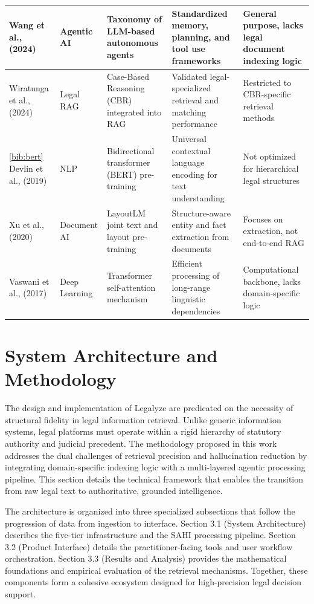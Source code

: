 \documentclass[a4paper,fleqn]{cas-dc}
\begin{document}
\begin{table}[t!]
\begin{tabular}{|m{2.3cm}|m{1.5cm}|m{3cm}|m{4cm}|m{4cm}|}
Wang et al., (2024) & Agentic AI & Taxonomy of LLM-based autonomous agents & Standardized memory, planning, and tool use frameworks & General purpose, lacks legal document indexing logic \\ \hline
Wiratunga et al., (2024) & Legal RAG & Case-Based Reasoning (CBR) integrated into RAG & Validated legal-specialized retrieval and matching performance & Restricted to CBR-specific retrieval methods \\ \hline
\ref{bib:bert} Devlin et al., (2019) & NLP & Bidirectional transformer (BERT) pre-training & Universal contextual language encoding for text understanding & Not optimized for hierarchical legal structures \\ \hline
Xu et al., (2020) & Document AI & LayoutLM joint text and layout pre-training & Structure-aware entity and fact extraction from documents & Focuses on extraction, not end-to-end RAG \\ \hline
Vaswani et al., (2017) & Deep Learning & Transformer self-attention mechanism & Efficient processing of long-range linguistic dependencies & Computational backbone, lacks domain-specific logic \\ \hline
\end{tabular}
\end{table}

\clearpage %
\section{System Architecture and Methodology}
The design and implementation of Legalyze are predicated on the necessity of structural fidelity in legal information retrieval. Unlike generic information systems, legal platforms must operate within a rigid hierarchy of statutory authority and judicial precedent. The methodology proposed in this work addresses the dual challenges of retrieval precision and hallucination reduction by integrating domain-specific indexing logic with a multi-layered agentic processing pipeline. This section details the technical framework that enables the transition from raw legal text to authoritative, grounded intelligence.

The architecture is organized into three specialized subsections that follow the progression of data from ingestion to interface. Section 3.1 (System Architecture) describes the five-tier infrastructure and the SAHI processing pipeline. Section 3.2 (Product Interface) details the practitioner-facing tools and user workflow orchestration. Section 3.3 (Results and Analysis) provides the mathematical foundations and empirical evaluation of the retrieval mechanisms. Together, these components form a cohesive ecosystem designed for high-precision legal decision support.
\end{document}
